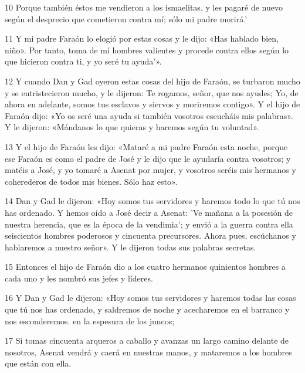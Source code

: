\par 10 Porque también éstos me vendieron a los ismaelitas, y les pagaré de nuevo según el desprecio que cometieron contra mí; sólo mi padre morirá.'

\par 11 Y mi padre Faraón lo elogió por estas cosas y le dijo: «Has hablado bien, niño». Por tanto, toma de mí hombres valientes y procede contra ellos según lo que hicieron contra ti, y yo seré tu ayuda'».

\par 12 Y cuando Dan y Gad oyeron estas cosas del hijo de Faraón, se turbaron mucho y se entristecieron mucho, y le dijeron: Te rogamos, señor, que nos ayudes; Yo, de ahora en adelante, somos tus esclavos y siervos y moriremos contigo». Y el hijo de Faraón dijo: «Yo os seré una ayuda si también vosotros escucháis mis palabras». Y le dijeron: «Mándanos lo que quieras y haremos según tu voluntad».

\par 13 Y el hijo de Faraón les dijo: «Mataré a mi padre Faraón esta noche, porque ese Faraón es como el padre de José y le dijo que le ayudaría contra vosotros; y matéis a José, y yo tomaré a Asenat por mujer, y vosotros seréis mis hermanos y coherederos de todos mis bienes. Sólo haz esto».

\par 14 Dan y Gad le dijeron: «Hoy somos tus servidores y haremos todo lo que tú nos has ordenado. Y hemos oído a José decir a Asenat: 'Ve mañana a la posesión de nuestra herencia, que es la época de la vendimia'; y envió a la guerra contra ella seiscientos hombres poderosos y cincuenta precursores. Ahora pues, escúchanos y hablaremos a nuestro señor». Y le dijeron todas sus palabras secretas.

\par 15 Entonces el hijo de Faraón dio a los cuatro hermanos quinientos hombres a cada uno y les nombró sus jefes y líderes.

\par 16 Y Dan y Gad le dijeron: «Hoy somos tus servidores y haremos todas las cosas que tú nos has ordenado, y saldremos de noche y acecharemos en el barranco y nos esconderemos. en la espesura de los juncos;

\par 17 Si tomas cincuenta arqueros a caballo y avanzas un largo camino delante de nosotros, Asenat vendrá y caerá en nuestras manos, y mataremos a los hombres que están con ella.

